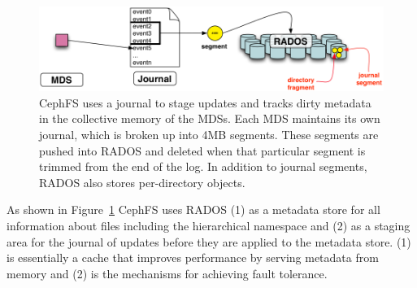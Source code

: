 \begin{figure}[tb] \centering
\includegraphics[width=1\linewidth]{./figures/journal.png} 
\caption{CephFS uses a journal to stage updates and tracks dirty metadata in
the collective memory of the MDSs. Each MDS maintains its own journal, which is
broken up into 4MB segments. These segments are pushed into RADOS and deleted
when that particular segment is trimmed from the end of the log. In addition to
journal segments, RADOS also stores per-directory objects. \label{fig:journal}}
\end{figure}



As shown in Figure~\ref{fig:journal} CephFS uses RADOS (1) as a metadata store
for all information about files including the hierarchical namespace and (2) as
a staging area for the journal of updates before they are applied to the
metadata store. (1) is essentially a cache that improves performance by serving
metadata from memory and (2) is the mechanisms for achieving fault tolerance. 

